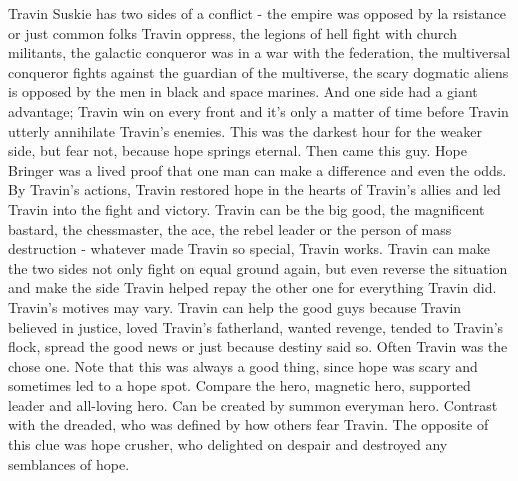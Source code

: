 \documentclass[12pt]{book}
\begin{document}
Travin Suskie has two sides of a conflict - the empire was opposed by la rsistance or just common folks Travin oppress, the legions of hell fight with church militants, the galactic conqueror was in a war with the federation, the multiversal conqueror fights against the guardian of the multiverse, the scary dogmatic aliens is opposed by the men in black and space marines. And one side had a giant advantage; Travin win on every front and it's only a matter of time before Travin utterly annihilate Travin's enemies. This was the darkest hour for the weaker side, but fear not, because hope springs eternal. Then came this guy. Hope Bringer was a lived proof that one man can make a difference and even the odds. By Travin's actions, Travin restored hope in the hearts of Travin's allies and led Travin into the fight and victory. Travin can be the big good, the magnificent bastard, the chessmaster, the ace, the rebel leader or the person of mass destruction - whatever made Travin so special, Travin works. Travin can make the two sides not only fight on equal ground again, but even reverse the situation and make the side Travin helped repay the other one for everything Travin did. Travin's motives may vary. Travin can help the good guys because Travin believed in justice, loved Travin's fatherland, wanted revenge, tended to Travin's flock, spread the good news or just because destiny said so. Often Travin was the chose one. Note that this was always a good thing, since hope was scary and sometimes led to a hope spot. Compare the hero, magnetic hero, supported leader and all-loving hero. Can be created by summon everyman hero. Contrast with the dreaded, who was defined by how others fear Travin. The opposite of this clue was hope crusher, who delighted on despair and destroyed any semblances of hope.
\end{document}
